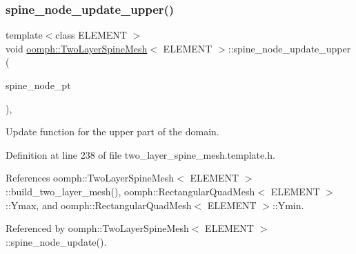 \mbox{\label{classoomph_1_1TwoLayerSpineMesh_adc173b7505ec801a4aa688f97ffe55e0}} 
\subsubsection{\texorpdfstring{spine\+\_\+node\+\_\+update\+\_\+upper()}{spine\_node\_update\_upper()}}
{\footnotesize\ttfamily template$<$class E\+L\+E\+M\+E\+NT $>$ \\
void \hyperlink{classoomph_1_1TwoLayerSpineMesh}{oomph\+::\+Two\+Layer\+Spine\+Mesh}$<$ E\+L\+E\+M\+E\+NT $>$\+::spine\+\_\+node\+\_\+update\+\_\+upper (\begin{DoxyParamCaption}\item[{Spine\+Node $\ast$}]{spine\+\_\+node\+\_\+pt }\end{DoxyParamCaption})\hspace{0.3cm}{\ttfamily [inline]}, {\ttfamily [protected]}}



Update function for the upper part of the domain. 



Definition at line 238 of file two\+\_\+layer\+\_\+spine\+\_\+mesh.\+template.\+h.



References oomph\+::\+Two\+Layer\+Spine\+Mesh$<$ E\+L\+E\+M\+E\+N\+T $>$\+::build\+\_\+two\+\_\+layer\+\_\+mesh(), oomph\+::\+Rectangular\+Quad\+Mesh$<$ E\+L\+E\+M\+E\+N\+T $>$\+::\+Ymax, and oomph\+::\+Rectangular\+Quad\+Mesh$<$ E\+L\+E\+M\+E\+N\+T $>$\+::\+Ymin.



Referenced by oomph\+::\+Two\+Layer\+Spine\+Mesh$<$ E\+L\+E\+M\+E\+N\+T $>$\+::spine\+\_\+node\+\_\+update().

\mbox{\label{classoomph_1_1TwoLayerSpineMesh_a36680574d0c8f023206ce8ffe1a99b06}} 
